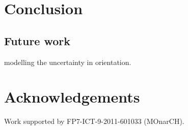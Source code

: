 \section{Conclusion}
\label{sec:conclusion}

\subsection{Future work}


 

modelling the uncertainty in orientation.


\section*{Acknowledgements}

Work supported by FP7-ICT-9-2011-601033 (MOnarCH).